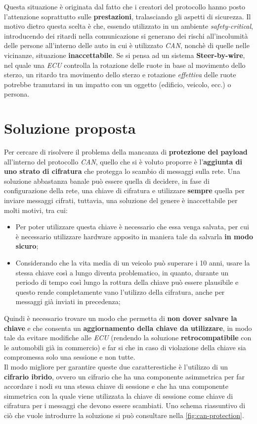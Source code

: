 Questa situazione è originata dal fatto che i creatori del protocollo hanno posto l'attenzione soprattutto sulle \textbf{prestazioni}, tralasciando gli aspetti di sicurezza. Il motivo dietro questa scelta è che, essendo utilizzato in un ambiente \emph{safety-critical}, introducendo dei ritardi nella comunicazione si generano dei rischi all'incolumità delle persone all'interno delle auto in cui è utilizzato \emph{CAN}, nonchè di quelle nelle vicinanze, situazione \textbf{inaccettabile}. Se si pensa ad un sistema \textbf{Steer-by-wire}, nel quale una \emph{ECU} controlla la rotazione delle ruote in base al movimento dello sterzo, un ritardo tra movimento dello sterzo e rotazione \emph{effettiva} delle ruote potrebbe tramutarsi in un impatto con un oggetto (edificio, veicolo, ecc.) o persona.

\section{Soluzione proposta}
Per cercare di risolvere il problema della mancanza di \textbf{protezione del payload} all'interno del protocollo \emph{CAN}, quello che si è voluto proporre è l'\textbf{aggiunta di uno strato di cifratura} che protegga lo scambio di messaggi sulla rete. Una soluzione abbastanza banale può essere quella di decidere, in fase di configurazione della rete, una chiave di cifratura e utilizzare \textbf{sempre} quella per inviare messaggi cifrati, tuttavia, una soluzione del genere è inaccettabile per molti motivi, tra cui:
\begin{itemize}
    \item Per poter utilizzare questa chiave è necessario che essa venga salvata, per cui è necessario utilizzare hardware apposito in maniera tale da salvarla \textbf{in modo sicuro};
    \item Considerando che la vita media di un veicolo può superare i 10 anni, usare la stessa chiave così a lungo diventa problematico, in quanto, durante un periodo di tempo così lungo la rottura della chiave può essere plausibile e questo rende completamente vano l'utilizzo della cifratura, anche per messaggi già inviati in precedenza;
\end{itemize}

Quindi è necessario trovare un modo che permetta di \textbf{non dover salvare la chiave} e che consenta un \textbf{aggiornamento della chiave da utilizzare}, in modo tale da evitare modifiche alle \emph{ECU} (rendendo la soluzione \textbf{retrocompatibile} con le automobili già in commercio) e far si che in caso di violazione della chiave sia compromessa solo una sessione e non tutte.\\
Il modo migliore per garantire queste due caratterestiche è l'utilizzo di un \textbf{cifrario ibrido}, ovvero un cifrario che ha una componente asimmetrica per far accordare i nodi su una stessa chiave di sessione e che ha una componente simmetrica con la quale viene utilizzata la chiave di sessione come chiave di cifratura per i messaggi che devono essere scambiati. Uno schema riassuntivo di ciò che vuole introdurre la soluzione si può consultare nella \autoref{fig:can-protection}.


